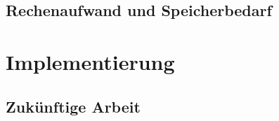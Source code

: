 \newpage
\section{Rechenaufwand und Speicherbedarf}
\label{ch:Content2:sec:Rechenaufwand}


\newpage
\chapter{Implementierung}
\label{ch:Implementierung}


\newpage
\section{Zukünftige Arbeit}
\label{ch:Content3:sec:ZukünftigeArbeit}




